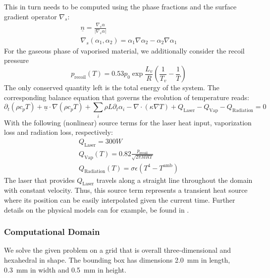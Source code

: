 \documentclass[sn-mathphys,Numbered]{sn-jnl}%
\theoremstyle{thmstyleone}%
\theoremstyle{thmstyletwo}%
\theoremstyle{thmstylethree}%
\begin{document}
This in turn needs to be computed using the phase fractions and the surface gradient operator $\nabla_s$:
\begin{align}
    \underline{n} = \frac{\nabla_s \alpha}{\lvert \nabla_s \alpha \rvert} \label{eq:unit-normal} \\
    \nabla_s(\alpha_1,\alpha_2) = \alpha_1 \nabla \alpha_2 - \alpha_2 \nabla \alpha_1 \label{eq:interface-gradient}
\end{align}
For the gaseous phase of vaporised material, we additionally consider the recoil pressure
\begin{equation}\label{eq:recoil-pressure}
    p_\text{recoil}(T) = 0.53 p_0 \exp{\frac{L_v}{R} \left( \frac{1}{T_v}-\frac{1}{T} \right)}
\end{equation}
The only conserved quantity left is the total energy of the system.
The corresponding balance equation that governs the evolution of temperature reads:
\begin{equation}\label{eq:heat-balance}
    \partial_t (\rho c_p T) + \underline{u} \cdot \nabla (\rho c_p T) + \sum_i \rho L \partial_t \alpha_i - \nabla \cdot (\kappa \nabla T)  + Q_\text{Laser} - Q_\text{Vap} - Q_\text{Radiation} = 0
\end{equation}
With the following (nonlinear) source terms for the laser heat input, vaporization loss and radiation loss, respectively:
\begin{align}
    Q_\text{Laser} = 300 W \label{eq:laser-heat}\\
    Q_\text{Vap}(T) = 0.82 \frac{p_\text{recoil}}{\sqrt{2\pi MRT}} \label{eq:vapor-heat} \\
    Q_\text{Radiation}(T) = \sigma \epsilon (T^4 - T^\text{amb}) \label{eq:radiation-heat}
\end{align}
The laser that provides $Q_\text{Laser}$ travels along a straight line throughout the domain with constant velocity.
Thus, this source term represents a transient heat source where its position can be easily interpolated given the current time.
Further details on the physical models can for example,  be found in \cite{zimbrodEfficientSimulationComplex2022}.

\subsubsection{Computational Domain}

We solve the given problem on a grid that is overall three-dimensional and hexahedral in shape.
The bounding box has dimensions \SI{2.0}{\milli\metre} in length, \SI{0.3}{\milli\metre} in width and \SI{0.5}{\milli\metre} in height.
\end{document}

